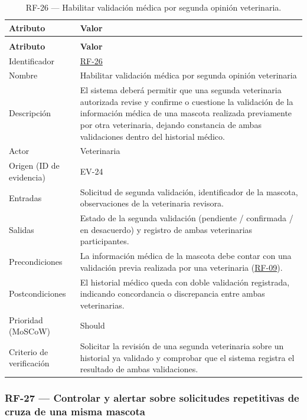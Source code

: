 \documentclass[journal,onecolumn]{IEEEtran}
\makeatletter
\newenvironment{atributos}[2]{%
	\small
	\begin{longtable}{@{}>{\raggedright\arraybackslash}p{4.2cm} >{\raggedright\arraybackslash}p{11.2cm}@{}}
		\caption{#2}\label{tab:#1}\\
		\toprule
		\textbf{Atributo} & \textbf{Valor} \\
		\midrule
		\endfirsthead
		\multicolumn{2}{@{}l}{\small\itshape (continuación)}\\
		\toprule
		\textbf{Atributo} & \textbf{Valor} \\
		\midrule
		\endhead
		\bottomrule
		\endlastfoot
	}{%
	\end{longtable}
	\normalsize
}
\makeatother
\begin{document}
	\begin{atributos}{RF-26}{RF-26 --- Habilitar validación médica por segunda opinión veterinaria.}
		Identificador & \hyperref[tab:RF-26]{RF-26} \\
		Nombre & Habilitar validación médica por segunda opinión veterinaria \\
		Descripción & El sistema deberá permitir que una segunda veterinaria autorizada revise y confirme o cuestione la validación de la información médica de una mascota realizada previamente por otra veterinaria, dejando constancia de ambas validaciones dentro del historial médico. \\
		Actor & Veterinaria \\
		Origen (ID de evidencia) & EV-24 \\
		Entradas & Solicitud de segunda validación, identificador de la mascota, observaciones de la veterinaria revisora. \\
		Salidas & Estado de la segunda validación (pendiente / confirmada / en desacuerdo) y registro de ambas veterinarias participantes. \\
		Precondiciones & La información médica de la mascota debe contar con una validación previa realizada por una veterinaria (\hyperref[tab:RF-09]{RF-09}). \\
		Postcondiciones & El historial médico queda con doble validación registrada, indicando concordancia o discrepancia entre ambas veterinarias. \\
		Prioridad (MoSCoW) & Should \\
		Criterio de verificación & Solicitar la revisión de una segunda veterinaria sobre un historial ya validado y comprobar que el sistema registra el resultado de ambas validaciones. \\
	\end{atributos}
	
	\subsubsection{RF-27 --- Controlar y alertar sobre solicitudes repetitivas de cruza de una misma mascota}
	
\end{document}
